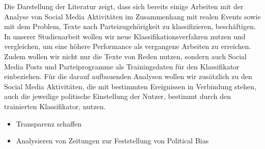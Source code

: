 Die Darstellung der Literatur zeigt, dass sich bereits einige Arbeiten mit der Analyse von Social Media Aktivitäten im Zusammenhang mit realen Events sowie mit dem Problem, Texte nach Parteizugehörigkeit zu klassifizieren, beschäftigen.
In unserer Studienarbeit wollen wir neue Klassifikationsverfahren nutzen und vergleichen, um eine höhere Performance als vergangene Arbeiten zu erreichen.
Zudem wollen wir nicht nur die Texte von Reden nutzen, sondern auch Social Media Posts und Parteiprogramme als Trainingsdaten für den Klassifikator einbeziehen.
Für die darauf aufbauenden Analysen wollen wir zusätzlich zu den Social Media Aktivitäten, die mit bestimmten Ereignissen in Verbindung stehen, auch die jeweilige politische Einstellung der Nutzer, bestimmt durch den trainierten Klassifikator, nutzen.

\begin{itemize}
    \item Transparenz schaffen
    \item Analysieren von Zeitungen zur Feststellung von Political Bias
\end{itemize}
